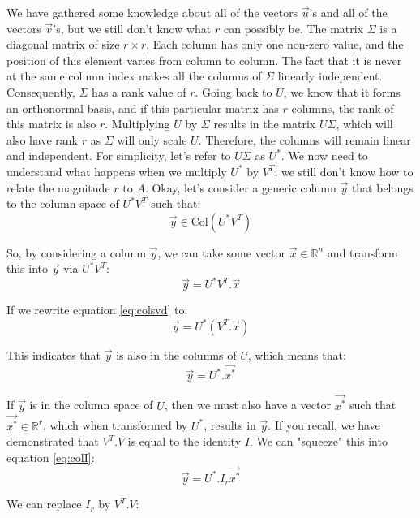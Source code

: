 \documentclass[a4,12pt,twosided,openany]{memoir}
\begin{document}
We have gathered some knowledge about all of the vectors $\overrightarrow{u}$’s and all of the vectors  $\overrightarrow{v}$’s, but we still don’t know what $r$ can possibly be. The matrix $\Sigma$ is a diagonal matrix of size $r \times r$. Each column has only one non-zero value, and the position of this element varies from column to column. The fact that it is never at the same column index makes all the columns of $\Sigma$ linearly independent. Consequently, $\Sigma$ has a rank value of $r$. Going back to $U$, we know that it forms an orthonormal basis, and if this particular matrix has $r$ columns, the rank of this matrix is also $r$. Multiplying $U$ by $\Sigma$ results in the matrix $U\Sigma$, which will also have rank $r$ as $\Sigma$ will only scale $U$. Therefore, the columns will remain linear and independent. For simplicity, let’s refer to $U\Sigma$ as $U^*$. We now need to understand what happens when we multiply $U^*$ by $V^T$; we still don’t know how to relate the magnitude $r$ to $A$. Okay, let’s consider a generic column $\overrightarrow{y}$ that belongs to the column space of $U^*V^T$ such that:
\[\overrightarrow{y} \in \textrm{Col}(U^* V^T)\]
\par 
\indent
So, by considering a column $\overrightarrow{y}$, we can take some vector $\overrightarrow{x} \in \mathbb{R}^n$ and transform this into $\overrightarrow{y}$ via $U^*V^T$:
\begin{equation} \label{eq:colsvd}
\overrightarrow{y} = U^* V^T.\overrightarrow{x}
\end{equation}
\par 
\indent
If we rewrite equation \ref{eq:colsvd} to:
\[\overrightarrow{y} = U^* \left( V^T.\overrightarrow{x}\right) \]
\par 
\indent
This indicates that $\overrightarrow{y}$ is also in the columns of $U$, which means that:
\begin{equation}\label{eq:colI}
\overrightarrow{y} = U^*.\overrightarrow{x^*}
\end{equation}
\par 
\indent
If $\overrightarrow{y}$ is in the column space of $U$, then we must also have a vector $\overrightarrow{x^*}$ such that $\overrightarrow{x^*} \in \mathbb{R}^r$, which when transformed by $U^*$, results in $\overrightarrow{y}$. If you recall, we have demonstrated that $V^T.V$  is equal to the identity $I$. We can "squeeze" this into equation \ref{eq:colI}:
\[\overrightarrow{y} = U^*.I_r\overrightarrow{x^*}\]
\par 
\indent
We can replace $I_r$ by $V^T.V$:
\end{document}
